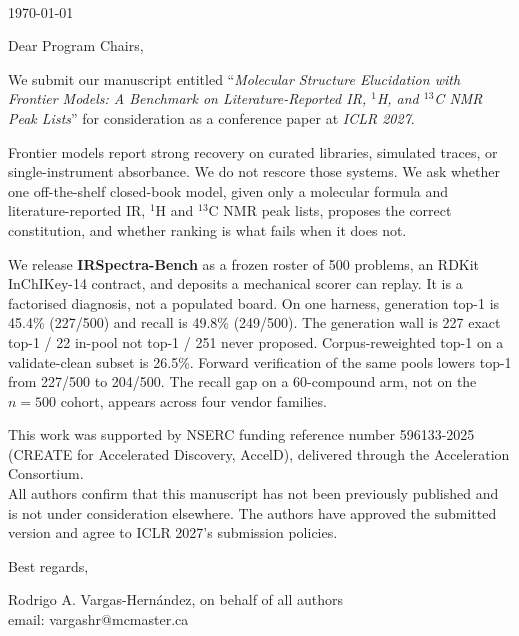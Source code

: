 \documentclass{article}
\begin{document}
$\;$\\
\vspace{-0.3cm}

\begin{flushright}
\today
\end{flushright}

\vspace{-0.1cm}
Dear Program Chairs,\\
\vspace{0.2cm}


We submit our manuscript entitled ``\emph{Molecular Structure Elucidation with Frontier Models: A Benchmark on Literature-Reported IR, $^1$H, and $^{13}$C NMR Peak Lists}'' for consideration as a conference paper at \emph{ICLR 2027}.

Frontier models report strong recovery on curated libraries, simulated traces, or single-instrument absorbance. We do not rescore those systems. We ask whether one off-the-shelf closed-book model, given only a molecular formula and literature-reported IR, $^1$H and $^{13}$C NMR peak lists, proposes the correct constitution, and whether ranking is what fails when it does not.

We release \textbf{IRSpectra-Bench} as a frozen roster of 500 problems, an RDKit InChIKey-14 contract, and deposits a mechanical scorer can replay. It is a factorised diagnosis, not a populated board.
On one harness, generation top-1 is 45.4\% (227/500) and recall is 49.8\% (249/500).
The generation wall is 227 exact top-1 / 22 in-pool not top-1 / 251 never proposed.
Corpus-reweighted top-1 on a validate-clean subset is 26.5\%.
Forward verification of the same pools lowers top-1 from 227/500 to 204/500.
The recall gap on a 60-compound arm, not on the $n{=}500$ cohort, appears across four vendor families.

This work was supported by NSERC funding reference number 596133-2025 (CREATE for Accelerated Discovery, AccelD), delivered through the Acceleration Consortium.\\

All authors confirm that this manuscript has not been previously published and is not under consideration elsewhere. The authors have approved the submitted version and agree to ICLR 2027's submission policies.

\vspace{0.5cm}

Best regards,\vspace{0.5cm}\\
\begin{center}
Rodrigo A. Vargas-Hern\'{a}ndez, on behalf of all authors \\
email: vargashr@mcmaster.ca
\end{center}
\end{document}
